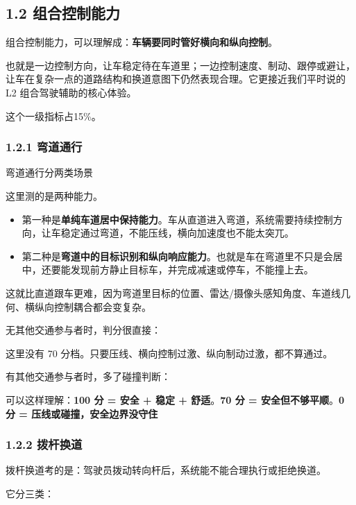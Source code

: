 \subsection{1.2 组合控制能力}

组合控制能力，可以理解成：\textbf{车辆要同时管好横向和纵向控制}。

也就是一边控制方向，让车稳定待在车道里；一边控制速度、制动、跟停或避让，让车在复杂一点的道路结构和换道意图下仍然表现合理。它更接近我们平时说的L2 组合驾驶辅助的核心体验。

这个一级指标占15\%。

\subsubsection{1.2.1 弯道通行}

弯道通行分两类场景

这里测的是两种能力。

\begin{itemize}
  \item 第一种是\textbf{单纯车道居中保持能力}。车从直道进入弯道，系统需要持续控制方向，让车稳定通过弯道，不能压线，横向加速度也不能太突兀。
  \item 第二种是\textbf{弯道中的目标识别和纵向响应能力}。也就是车在弯道里不只是会居中，还要能发现前方静止目标车，并完成减速或停车，不能撞上去。
\end{itemize}

这就比直道跟车更难，因为弯道里目标的位置、雷达/摄像头感知角度、车道线几何、横纵向控制耦合都会变复杂。

无其他交通参与者时，判分很直接：

这里没有 70 分档。只要压线、横向控制过激、纵向制动过激，都不算通过。

有其他交通参与者时，多了碰撞判断：

可以这样理解：\textbf{100 分 = 安全 + 稳定 + 舒适}。\textbf{70 分 = 安全但不够平顺}。\textbf{0 分 = 压线或碰撞，安全边界没守住}

\subsubsection{1.2.2 拨杆换道}

拨杆换道考的是：驾驶员拨动转向杆后，系统能不能合理执行或拒绝换道。

它分三类：

